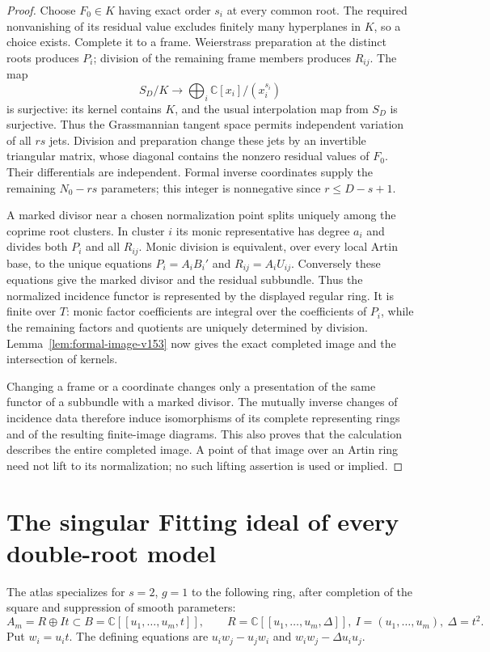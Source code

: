 \documentclass[11pt,reqno]{amsart}
\numberwithin{equation}{section}
\theoremstyle{definition}\newtheorem{definition}[theorem]{Definition}
\theoremstyle{remark}\newtheorem{remark}[theorem]{Remark}
\newcommand{\C}{\mathbb C}\newcommand{\Q}{\mathbb Q}
\begin{document}
\begin{proof}
Choose $F_0\in K$ having exact order $s_i$ at every common root.
The required nonvanishing of its residual value excludes finitely
many hyperplanes in $K$, so a choice exists. Complete it to a frame.
Weierstrass preparation at the distinct roots produces $P_i$; division
of the remaining frame members produces $R_{ij}$. The map
\[
 S_D/K\longrightarrow\bigoplus_i\C[x_i]/(x_i^{s_i})
\]
is surjective: its kernel contains $K$, and the usual interpolation
map from $S_D$ is surjective. Thus the Grassmannian tangent space
permits independent variation of all $rs$ jets. Division and preparation
change these jets by an invertible triangular matrix, whose diagonal
contains the nonzero residual values of $F_0$. Their differentials
are independent. Formal inverse coordinates supply the remaining
$N_0-rs$ parameters; this integer is nonnegative since
$r\leq D-s+1$.

A marked divisor near a chosen normalization point splits uniquely
among the coprime root clusters. In cluster $i$ its monic representative
has degree $a_i$ and divides both $P_i$ and all $R_{ij}$. Monic division
is equivalent, over every local Artin base, to the unique equations
$P_i=A_iB_i'$ and $R_{ij}=A_iU_{ij}$. Conversely these equations give
the marked divisor and the residual subbundle. Thus the normalized
incidence functor is represented by the displayed regular ring.
It is finite over $T$: monic factor coefficients are integral over the
coefficients of $P_i$, while the remaining factors and quotients are
uniquely determined by division. Lemma~\ref{lem:formal-image-v153}
now gives the exact completed image and the intersection of kernels.

Changing a frame or a coordinate changes only a presentation of the
same functor of a subbundle with a marked divisor. The mutually inverse
changes of incidence data therefore induce isomorphisms of its complete
representing rings and of the resulting finite-image diagrams. This
also proves that the calculation describes the entire completed image.
A point of that image over an Artin ring need not lift to its
normalization; no such lifting assertion is used or implied.
\end{proof}

\section{The singular Fitting ideal of every double-root model}
\label{sec:fitting-v153}
The atlas specializes for $s=2$, $g=1$ to the following ring, after
completion of the square and suppression of smooth parameters:
\[
 A_m=R\oplus It\subset B=\C[[u_1,\ldots,u_m,t]],\qquad
 R=\C[[u_1,\ldots,u_m,\Delta]],\ I=(u_1,\ldots,u_m),\ \Delta=t^2.
\]
Put $w_i=u_it$. The defining equations are
$u_iw_j-u_jw_i$ and $w_iw_j-\Delta u_iu_j$.
\end{document}
